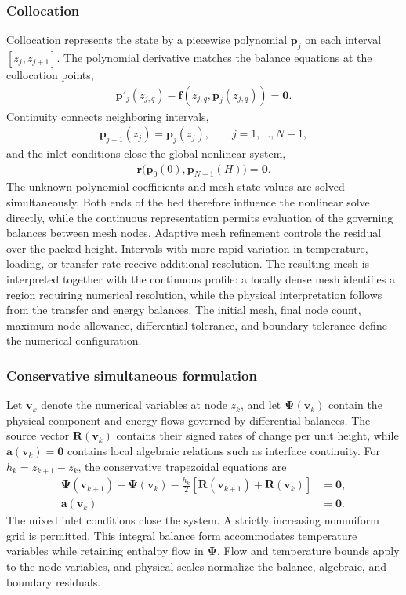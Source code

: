 \subsubsection{Collocation}
Collocation represents the state by a piecewise polynomial $\mathbf p_j$ on each interval $[z_j,z_{j+1}]$.
The polynomial derivative matches the balance equations at the collocation points,
\begin{align}
\mathbf p'_j(z_{j,q})-\mathbf f(z_{j,q},\mathbf p_j(z_{j,q}))=\mathbf0.
\end{align}
Continuity connects neighboring intervals,
\begin{align}
\mathbf p_{j-1}(z_j)=\mathbf p_j(z_j),\qquad j=1,\ldots,N-1,
\end{align}
and the inlet conditions close the global nonlinear system,
\begin{align}
\mathbf r\bigl(\mathbf p_0(0),\mathbf p_{N-1}(H)\bigr)=\mathbf0.
\end{align}
The unknown polynomial coefficients and mesh-state values are solved simultaneously.
Both ends of the bed therefore influence the nonlinear solve directly, while the continuous representation permits evaluation of the governing balances between mesh nodes.
Adaptive mesh refinement controls the residual over the packed height.
Intervals with more rapid variation in temperature, loading, or transfer rate receive additional resolution.
The resulting mesh is interpreted together with the continuous profile: a locally dense mesh identifies a region requiring numerical resolution, while the physical interpretation follows from the transfer and energy balances.
The initial mesh, final node count, maximum node allowance, differential tolerance, and boundary tolerance define the numerical configuration.

\subsubsection{Conservative simultaneous formulation}
Let $\mathbf v_k$ denote the numerical variables at node $z_k$, and let $\boldsymbol\Psi(\mathbf v_k)$ contain the physical component and energy flows governed by differential balances.
The source vector $\mathbf R(\mathbf v_k)$ contains their signed rates of change per unit height, while $\mathbf a(\mathbf v_k)=\mathbf0$ contains local algebraic relations such as interface continuity.
For $h_k=z_{k+1}-z_k$, the conservative trapezoidal equations are
\begin{align}
\boldsymbol\Psi(\mathbf v_{k+1})-\boldsymbol\Psi(\mathbf v_k)
-\frac{h_k}{2}\left[\mathbf R(\mathbf v_{k+1})+\mathbf R(\mathbf v_k)\right]&=\mathbf0,
\label{eq:conservative-trapezoid}\\
\mathbf a(\mathbf v_k)&=\mathbf0.
\end{align}
The mixed inlet conditions close the system.
A strictly increasing nonuniform grid is permitted.
This integral balance form accommodates temperature variables while retaining enthalpy flow in $\boldsymbol\Psi$.
Flow and temperature bounds apply to the node variables, and physical scales normalize the balance, algebraic, and boundary residuals.

